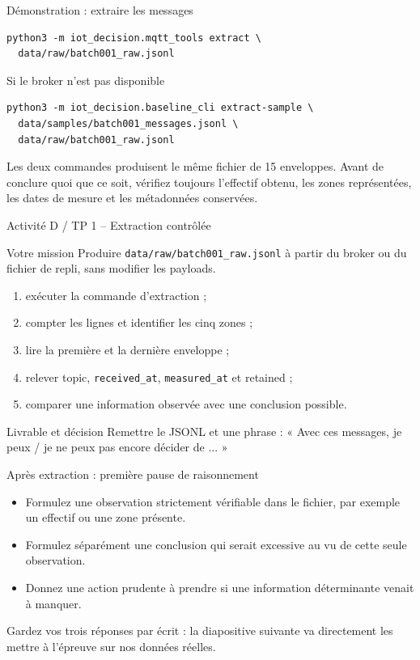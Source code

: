 \documentclass[aspectratio=169]{beamer}
\begin{document}
\begin{frame}[fragile]{Démonstration : extraire les messages}
  \scriptsize
  \begin{verbatim}
python3 -m iot_decision.mqtt_tools extract \
  data/raw/batch001_raw.jsonl
  \end{verbatim}
  \begin{block}{Si le broker n'est pas disponible}
  \begin{verbatim}
python3 -m iot_decision.baseline_cli extract-sample \
  data/samples/batch001_messages.jsonl \
  data/raw/batch001_raw.jsonl
  \end{verbatim}
  \end{block}
  \normalsize
  Les deux commandes produisent le même fichier de 15 enveloppes. Avant de conclure quoi que ce soit, vérifiez toujours l'effectif obtenu, les zones représentées, les dates de mesure et les métadonnées conservées.
\end{frame}

\begin{frame}{Activité D / TP 1 -- Extraction contrôlée}
  \begin{block}{Votre mission}
    Produire \texttt{data/raw/batch001\_raw.jsonl} à partir du broker ou du fichier de repli, sans modifier les payloads.
  \end{block}
  \begin{enumerate}
    \item exécuter la commande d'extraction ;
    \item compter les lignes et identifier les cinq zones ;
    \item lire la première et la dernière enveloppe ;
    \item relever topic, \texttt{received\_at}, \texttt{measured\_at} et retained ;
    \item comparer une information observée avec une conclusion possible.
  \end{enumerate}
  \begin{block}{Livrable et décision}
    Remettre le JSONL et une phrase : « Avec ces messages, je peux / je ne peux pas encore décider de ... »
  \end{block}
\end{frame}

\begin{frame}{Après extraction : première pause de raisonnement}
  \begin{itemize}
    \item Formulez une observation strictement vérifiable dans le fichier, par exemple un effectif ou une zone présente.
    \item Formulez séparément une conclusion qui serait excessive au vu de cette seule observation.
    \item Donnez une action prudente à prendre si une information déterminante venait à manquer.
  \end{itemize}
  \vfill
  \normalsize Gardez vos trois réponses par écrit : la diapositive suivante va directement les mettre à l'épreuve sur nos données réelles.
\end{frame}
\end{document}
